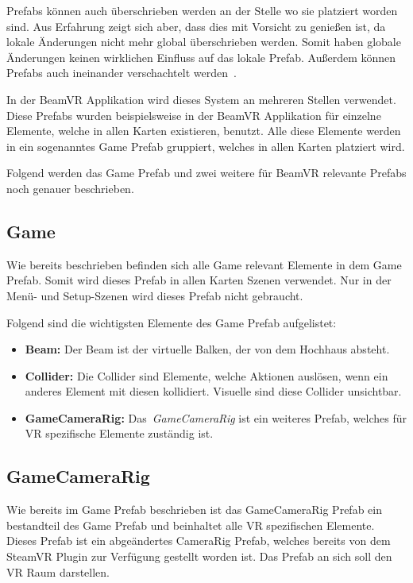 Prefabs können auch überschrieben werden an der Stelle wo sie platziert worden sind.
Aus Erfahrung zeigt sich aber, dass dies mit Vorsicht zu genießen ist, da lokale Änderungen nicht mehr global überschrieben werden.
Somit haben globale Änderungen keinen wirklichen Einfluss auf das lokale Prefab.
Außerdem können Prefabs auch ineinander verschachtelt werden~\cite{Unity_Prefabs}.

In der BeamVR Applikation wird dieses System an mehreren Stellen verwendet.
Diese Prefabs wurden beispielsweise in der BeamVR Applikation für einzelne Elemente, welche in allen Karten existieren, benutzt.
Alle diese Elemente werden in ein sogenanntes Game Prefab gruppiert, welches in allen Karten platziert wird.

Folgend werden das Game Prefab und zwei weitere für BeamVR relevante Prefabs noch genauer beschrieben.

\subsection{Game}\label{subsec:game-prefab}

Wie bereits beschrieben befinden sich alle Game relevant Elemente in dem Game Prefab.
Somit wird dieses Prefab in allen Karten Szenen verwendet.
Nur in der Menü- und Setup-Szenen wird dieses Prefab nicht gebraucht.

Folgend sind die wichtigsten Elemente des Game Prefab aufgelistet:

\begin{itemize}
    \item \textbf{Beam:} Der Beam ist der virtuelle Balken, der von dem Hochhaus absteht.
    \item \textbf{Collider:} Die Collider sind Elemente, welche Aktionen auslösen, wenn ein anderes Element mit diesen kollidiert.
    Visuelle sind diese Collider unsichtbar.
    \item \textbf{GameCameraRig:} Das~\emph{GameCameraRig} ist ein weiteres Prefab, welches für VR spezifische Elemente zuständig ist.
\end{itemize}


\subsection{GameCameraRig}\label{subsec:game-camera-rig}

Wie bereits im Game Prefab beschrieben ist das GameCameraRig Prefab ein bestandteil des Game Prefab und beinhaltet alle VR spezifischen Elemente.
Dieses Prefab ist ein abgeändertes CameraRig Prefab, welches bereits von dem SteamVR Plugin zur Verfügung gestellt worden ist.
Das Prefab an sich soll den VR Raum darstellen.

